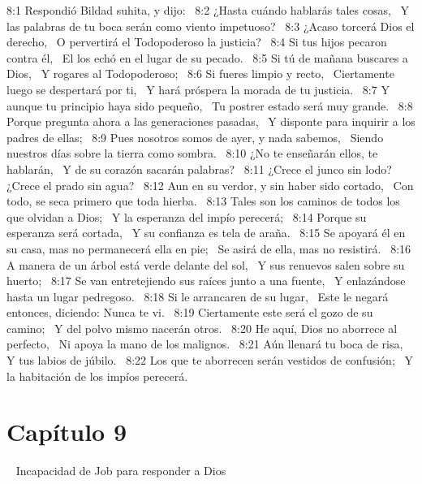 8:1 Respondió Bildad suhita, y dijo:  
8:2 ¿Hasta cuándo hablarás tales cosas,  
Y las palabras de tu boca serán como viento impetuoso?  
8:3 ¿Acaso torcerá Dios el derecho,  
O pervertirá el Todopoderoso la justicia?  
8:4 Si tus hijos pecaron contra él,  
El los echó en el lugar de su pecado.  
8:5 Si tú de mañana buscares a Dios,  
Y rogares al Todopoderoso;  
8:6 Si fueres limpio y recto,  
Ciertamente luego se despertará por ti,  
Y hará próspera la morada de tu justicia.  
8:7 Y aunque tu principio haya sido pequeño,  
Tu postrer estado será muy grande.  
8:8 Porque pregunta ahora a las generaciones pasadas,  
Y disponte para inquirir a los padres de ellas;  
8:9 Pues nosotros somos de ayer, y nada sabemos,  
Siendo nuestros días sobre la tierra como sombra.  
8:10 ¿No te enseñarán ellos, te hablarán,  
Y de su corazón sacarán palabras?  
8:11 ¿Crece el junco sin lodo?  
¿Crece el prado sin agua?  
8:12 Aun en su verdor, y sin haber sido cortado,  
Con todo, se seca primero que toda hierba.  
8:13 Tales son los caminos de todos los que olvidan a Dios;  
Y la esperanza del impío perecerá;  
8:14 Porque su esperanza será cortada,  
Y su confianza es tela de araña.  
8:15 Se apoyará él en su casa, mas no permanecerá ella en pie;  
Se asirá de ella, mas no resistirá.  
8:16 A manera de un árbol está verde delante del sol,  
Y sus renuevos salen sobre su huerto;  
8:17 Se van entretejiendo sus raíces junto a una fuente,  
Y enlazándose hasta un lugar pedregoso.  
8:18 Si le arrancaren de su lugar,  
Este le negará entonces, diciendo: Nunca te vi.  
8:19 Ciertamente este será el gozo de su camino;  
Y del polvo mismo nacerán otros.  
8:20 He aquí, Dios no aborrece al perfecto,  
Ni apoya la mano de los malignos.  
8:21 Aún llenará tu boca de risa,  
Y tus labios de júbilo.  
8:22 Los que te aborrecen serán vestidos de confusión;  
Y la habitación de los impíos perecerá.  
\section*{Capítulo 9} 
Incapacidad de Job para responder a Dios  

